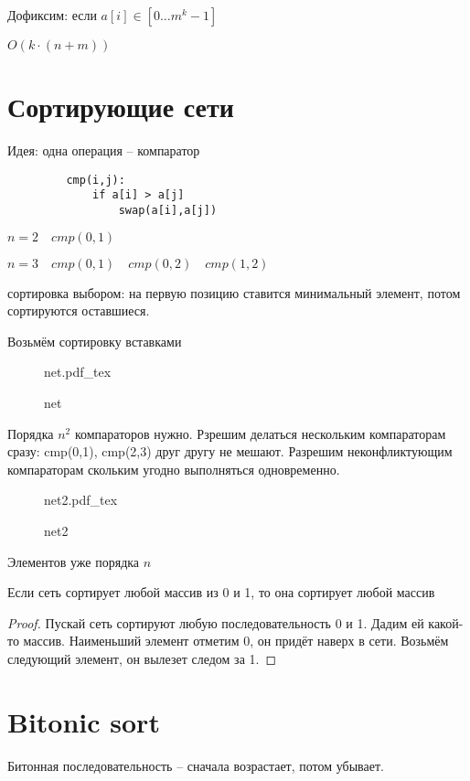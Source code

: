 \documentclass{book}
\theoremstyle{definition}
\newcommand{\incfig}[1]{%
    \def\svgwidth{\columnwidth}
    {#1.pdf_tex}
}
\begin{document}
     Дофиксим: если $a[i] \in [0 \ldots m^k-1]$

     $O(k\cdot (n+m))$

     \section{Сортирующие сети} 
     Идея: одна операция -- компаратор

     \begin{verbatim}
         cmp(i,j):
             if a[i] > a[j]
                 swap(a[i],a[j])
     \end{verbatim}

    $n=2\quad cmp(0,1)$

    $n=3\quad cmp(0,1)\quad cmp(0,2)\quad cmp(1,2)$

    сортировка выбором: на первую позицию ставится минимальный элемент, потом сортируются оставшиеся.

    Возьмём сортировку вставками

\begin{figure}[ht]
    \centering
    \incfig{net}
    \caption{net}
    \label{fig:net }
\end{figure}

Порядка $n^2$ компараторов нужно. Рзрешим делаться нескольким компараторам сразу: cmp(0,1), cmp(2,3) друг другу не мешают. Разрешим неконфликтующим компараторам скольким угодно выполняться одновременно.

\begin{figure}[ht]
    \centering
    \incfig{net2}
    \caption{net2}
    \label{fig:net2}
\end{figure}

Элементов уже порядка $n$

 \begin{statement}
    Если сеть сортирует любой массив из 0 и 1, то она сортирует любой массив
\end{statement}
\begin{proof}
    Пускай сеть сортируют любую последовательность 0 и 1. Дадим ей какой-то массив. Наименьший элемент отметим 0, он придёт наверх в сети. Возьмём следующий элемент, он вылезет следом за 1.
\end{proof}

\section{Bitonic sort}

Битонная последовательность -- сначала возрастает, потом убывает.
\end{document}
